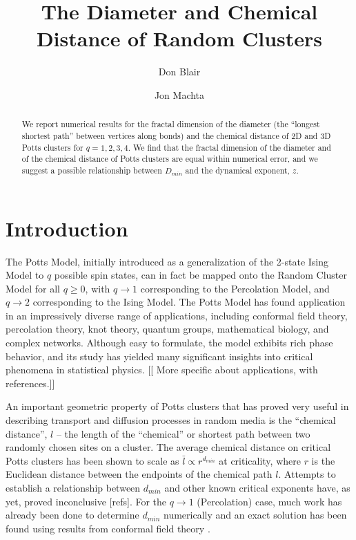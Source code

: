 \documentclass[aps, preprint, groupedaddress]{revtex4}
\begin{document}
\title{The Diameter and Chemical Distance of Random Clusters}

\author{Don Blair}
\author{Jon Machta}
\begin{abstract}

We report numerical results for the fractal dimension of the diameter (the ``longest shortest path'' between vertices along bonds) and the chemical distance of 2D and 3D Potts clusters for $q=1,2,3,4$.  We find that the fractal dimension of the diameter and of the chemical distance of Potts clusters are equal within numerical error, and we suggest a possible relationship between $D_{min}$ and the dynamical exponent, $z$.

\end{abstract}

\maketitle

\section{Introduction}

The Potts Model, initially introduced as a generalization of the 2-state Ising Model to $q$ possible spin states, can in fact be mapped onto the Random Cluster Model for all $q \ge 0$, with $q \to 1$ corresponding to the Percolation Model, and $q \to 2$ corresponding to the Ising Model.  The Potts Model has found application in an impressively diverse range of applications, including conformal field theory, percolation theory, knot theory, quantum groups, mathematical biology, and complex networks. Although easy to formulate, the model exhibits rich phase behavior, and its study has yielded many significant insights into critical phenomena in statistical physics. [[ More specific about applications, with references.]]

An important geometric property of Potts clusters that has proved very useful in describing transport and diffusion processes in random media is the ``chemical distance'', $l$ -- the length of the ``chemical'' or shortest path between two randomly chosen sites on a cluster.  The average chemical distance on critical Potts clusters has been shown to scale as $\bar{l} \propto r^{d_{min}}$ at criticality, where $r$ is the Euclidean distance between the endpoints of the chemical path $l$. Attempts to establish a relationship between $d_{min}$ and other known critical exponents have, as yet, proved inconclusive [refs].  For the $q \to 1$ (Percolation) case, much work has already been done to determine $d_{min}$ numerically \cite{Gr83, HrSt88} and an exact solution has been found using results from conformal field theory \cite{Zi99}.
\end{document}

